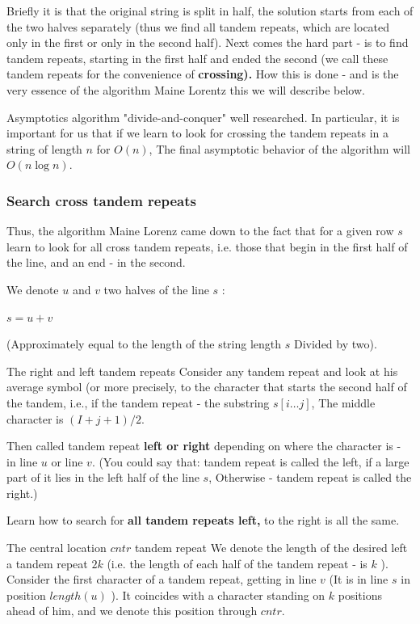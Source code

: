 Briefly it is that the original string is split in half, the solution starts from each of the two halves separately (thus we find all tandem repeats, which are located only in the first or only in the second half). Next comes the hard part - is to find tandem repeats, starting in the first half and ended the second (we call these tandem repeats for the convenience of \textbf{crossing).} How this is done - and is the very essence of the algorithm Maine Lorentz this we will describe below.

Asymptotics algorithm "divide-and-conquer" well researched. In particular, it is important for us that if we learn to look for crossing the tandem repeats in a string of length $n$ for $O (n)$, The final asymptotic behavior of the algorithm will $O (n \log n)$.

\subsubsection{ Search cross tandem repeats }

Thus, the algorithm Maine Lorenz came down to the fact that for a given row $s$ learn to look for all cross tandem repeats, i.e. those that begin in the first half of the line, and an end - in the second.

We denote $u$ and $v$ two halves of the line $s$ :

$s = u + v$

(Approximately equal to the length of the string length $s$ Divided by two).

The right and left tandem repeats
Consider any tandem repeat and look at his average symbol (or more precisely, to the character that starts the second half of the tandem, i.e., if the tandem repeat - the substring $s [i \ldots j]$, The middle character is $(I + j +1) / 2$.

Then called tandem repeat \textbf{left or right} depending on where the character is - in line $u$ or line $v$. (You could say that: tandem repeat is called the left, if a large part of it lies in the left half of the line $s$, Otherwise - tandem repeat is called the right.)

Learn how to search for \textbf{all tandem repeats left,} to the right is all the same.

The central location $cntr$ tandem repeat
We denote the length of the desired left a tandem repeat $2k$ (i.e. the length of each half of the tandem repeat - is $k$ ). Consider the first character of a tandem repeat, getting in line $v$ (It is in line $s$ in position $length (u)$ ). It coincides with a character standing on $k$ positions ahead of him, and we denote this position through $cntr$.

